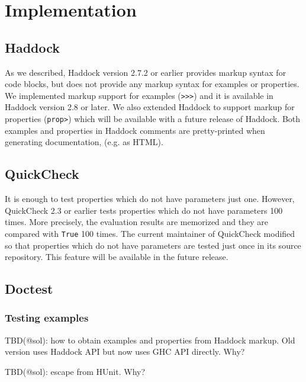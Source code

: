 \documentclass[preprint]{sigplanconf}
\newcommand{\doctest}{Doctest}
\begin{document}
\section{Implementation}

\subsection{Haddock}

As we described, Haddock version 2.7.2 or earlier provides markup syntax for
code blocks, but does not provide any markup syntax for examples or properties.
We implemented markup support for examples ({\tt >>>}) and it is available in
Haddock version 2.8 or later.
We also extended Haddock to support markup for properties ({\tt prop>}) which
will be available with a future release of Haddock.
Both examples and properties in Haddock comments are pretty-printed when
generating documentation, (e.g. as HTML).

\subsection{QuickCheck}

It is enough to test properties which do not have parameters just one.
However, QuickCheck 2.3 or earlier tests 
properties which do not have parameters 100 times.
More precisely, the evaluation results are memorized and they are
compared with {\tt True} 100 times.
The current maintainer of QuickCheck modified so that
properties which do not have parameters
are tested just once in its source repository.
This feature will be available in the future release.

\subsection{\doctest}
\label{sec:doctest}

\subsubsection{Testing examples}

TBD(@sol): how to obtain examples and properties from Haddock markup.
Old version uses Haddock API but now uses GHC API directly. Why?

TBD(@sol): escape from HUnit. Why?
\end{document}
